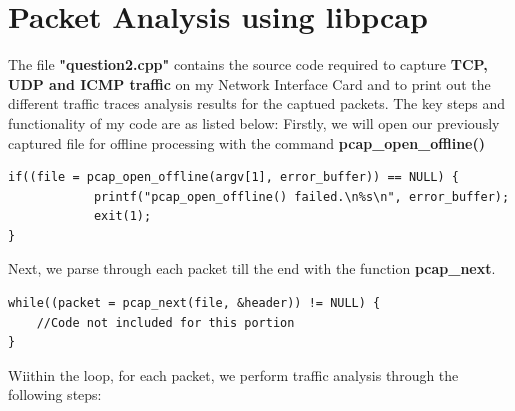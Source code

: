 \documentclass[a4paper,11pt]{article}
\begin{document}
\section{Packet Analysis using libpcap}
The file \textbf{"question2.cpp"} contains the source code required to capture \textbf{TCP, UDP and ICMP traffic} on my Network Interface Card and to print out the different traffic traces analysis results for the captued packets. The key steps and functionality of my code are as listed below:
\newline \newline
\noindent Firstly, we will open our previously captured file for offline processing with the command \textbf{pcap\_open\_offline()}
\begin{mdframed}[backgroundcolor=light-gray, roundcorner=30pt,leftmargin=1, rightmargin=1, innerleftmargin=5, innertopmargin=-3,innerbottommargin=5, outerlinewidth=1, linecolor=light-gray]
\begin{lstlisting}
if((file = pcap_open_offline(argv[1], error_buffer)) == NULL) {
			printf("pcap_open_offline() failed.\n%s\n", error_buffer);
			exit(1);
}
\end{lstlisting}
\end{mdframed}
Next, we parse through each packet till the end with the function \textbf{pcap\_next}. 
\begin{mdframed}[backgroundcolor=light-gray, roundcorner=30pt,leftmargin=1, rightmargin=1, innerleftmargin=5, innertopmargin=-3,innerbottommargin=5, outerlinewidth=1, linecolor=light-gray]
\begin{lstlisting}
while((packet = pcap_next(file, &header)) != NULL) {
	//Code not included for this portion
}
\end{lstlisting}
\end{mdframed}
Wiithin the loop, for each packet, we perform traffic analysis through the following steps:
\end{document}
